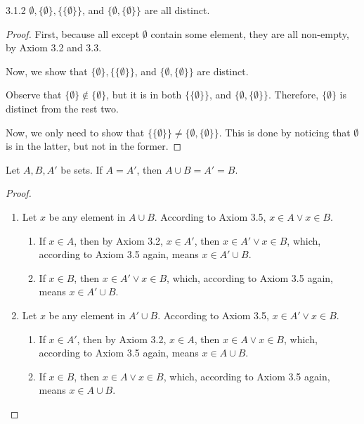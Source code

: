\begin{exercise}{3.1.2}
	$\emptyset, \{\emptyset\}, \{\{\emptyset\}\}$, and $\{\emptyset,\{\emptyset\}\}$ are all distinct.
\end{exercise}
\begin{proof}
	First, because all except $\emptyset$ contain some element, they are all non-empty, by Axiom 3.2 and 3.3.
	
	Now, we show that $\{\emptyset\}, \{\{\emptyset\}\}$, and $\{\emptyset,\{\emptyset\}\}$ are distinct. 
	
	Observe that $\{\emptyset\} \notin \{\emptyset\}$, but it is in both $\{\{\emptyset\}\}$, and $\{\emptyset,\{\emptyset\}\}$. Therefore, $\{\emptyset\}$ is distinct from the rest two.
	
	Now, we only need to show that $\{\{\emptyset\}\} \ne \{\emptyset,\{\emptyset\}\}$. This is done by noticing that $\emptyset$ is in the latter, but not in the former.
\end{proof}

\begin{why}{30}
	Let $A,B,A'$ be sets. If $A = A'$, then $A \cup B = A' = B$.
\end{why}
\begin{proof}\leavevmode
	\begin{enumerate}
		\item Let $x$ be any element in $A \cup B$. According to Axiom 3.5, $x \in A \vee x \in B$. 
		\begin{enumerate}
			\item If $x \in A$, then by Axiom 3.2, $x \in A'$, then $x \in A' \vee x \in B$, which, according to Axiom 3.5 again, means $x \in A' \cup B$. 
			\item If $x \in B$, then $x \in A' \vee x \in B$, which, according to Axiom 3.5 again, means $x \in A' \cup B$.
		\end{enumerate}
		
		\item Let $x$ be any element in $A' \cup B$. According to Axiom 3.5, $x \in A' \vee x \in B$. 
		\begin{enumerate}
			\item If $x \in A'$, then by Axiom 3.2, $x \in A$, then $x \in A \vee x \in B$, which, according to Axiom 3.5 again, means $x \in A \cup B$. 
			\item If $x \in B$, then $x \in A \vee x \in B$, which, according to Axiom 3.5 again, means $x \in A \cup B$.
		\end{enumerate}
	\end{enumerate}
\end{proof}

